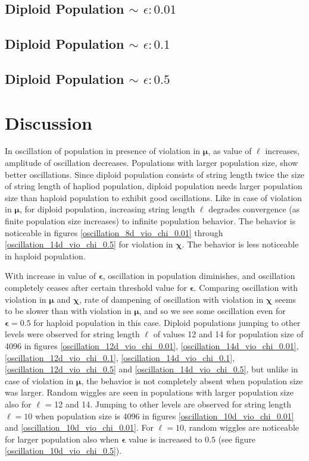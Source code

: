 \subsection{Diploid Population $\mathtt{\sim}$ $\epsilon: 0.01$}

\subsection{Diploid Population $\mathtt{\sim}$ $\epsilon: 0.1$}

\subsection{Diploid Population $\mathtt{\sim}$ $\epsilon: 0.5$}


\section{Discussion}
In oscillation of population in presence of violation in $\bm{\mu}$, 
as value of $\ell$ increases, amplitude of oscillation decreases. 
Populations with larger population size, show better oscillations. 
Since diploid population consists of string length twice the size of string length of hapliod population, 
diploid population needs larger population size than haploid population to exhibit good oscillations. 
Like in case of violation in $\bm{\mu}$, for diploid population, increasing string length $\ell$ 
degrades convergence (as finite population size increases) to infinite population behavior. 
The behavior is noticeable in figures 
\ref{oscillation_8d_vio_chi_0.01} through \ref{oscillation_14d_vio_chi_0.5} for violation in $\bm{\chi}$. 
The behavior is less noticeable in haploid population.

With increase in value of $\bm{\epsilon}$, 
oscillation in population diminishes, and oscillation completely ceases after certain threshold value for $\bm{\epsilon}$. 
Comparing oscillation with violation in $\bm{\mu}$ and $\bm{\chi}$, rate of dampening of oscillation with violation 
in $\bm{\chi}$ seems to be slower than with violation in ${\bm{\mu}}$, 
and so we see some oscillation even for $\bm{\epsilon} = 0.5$ for haploid population in this case. 
Diploid populations jumping to other levels 
were observed for string length $\ell$ of values 12 and 14 for population size of 4096 in 
figures \ref{oscillation_12d_vio_chi_0.01}, \ref{oscillation_14d_vio_chi_0.01}, \ref{oscillation_12d_vio_chi_0.1}, 
\ref{oscillation_14d_vio_chi_0.1}, \ref{oscillation_12d_vio_chi_0.5} and \ref{oscillation_14d_vio_chi_0.5}, 
but unlike in case of violation in $\bm{\mu}$, the behavior is not completely absent when population size was larger. 
Random wiggles are seen in populations with larger population size also for $\ell$ = 12 and 14. 
Jumping to other levels are observed for string length $\ell = 10$ when population size is 4096 in figures \ref{oscillation_10d_vio_chi_0.01} 
and \ref{oscillation_10d_vio_chi_0.01}.
For $\ell = 10$, random wiggles are 
noticeable for larger population also when $\bm{\epsilon}$ value is increased to $0.5$ (see figure \ref{oscillation_10d_vio_chi_0.5}).

